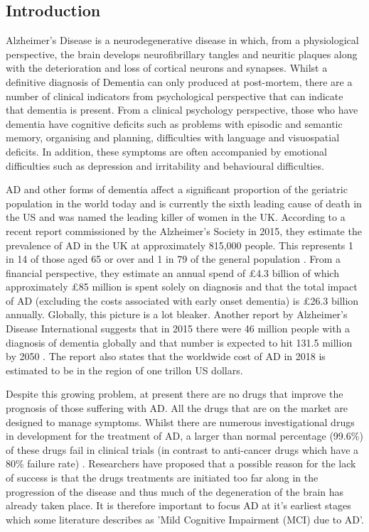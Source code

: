 \documentclass[12pt, twoside, a4paper]{article}
\begin{document}
\subsection{Introduction}
Alzheimer's Disease is a neurodegenerative disease in which, from a physiological perspective, the brain develops neurofibrillary tangles and neuritic plaques along with the deterioration and loss of cortical neurons and synapses. Whilst a definitive diagnosis of Dementia can only produced at post-mortem, there are a number of clinical indicators from psychological perspective that can indicate that dementia is present. From a clinical psychology perspective, those who have dementia have cognitive deficits such as problems with episodic and semantic memory, organising and planning, difficulties with language and visuospatial deficits\cite{AmericanPsychiatricAssociation2013}. In addition, these symptoms are often accompanied by emotional difficulties such as depression and irritability and behavioural difficulties. 
\par
AD and other forms of dementia affect a significant proportion of the geriatric population in the world today and is currently the sixth leading cause of death in the US and was named the leading killer of women in the UK. According to a recent report commissioned by the Alzheimer's Society in 2015, they estimate the prevalence of AD in the UK at approximately 815,000 people. This represents 1 in 14 of those aged 65 or over and 1 in 79 of the general population \cite{Sturrock2016}. From a financial perspective, they estimate an annual spend of £4.3 billion of which approximately £85 million is spent solely on diagnosis and that the total impact of AD (excluding the costs associated with early onset dementia) is £26.3 billion annually. Globally, this picture is a lot bleaker. Another report by Alzheimer's Disease International suggests that in 2015 there were 46 million people with a diagnosis of dementia globally and that number is expected to hit 131.5 million by 2050 \cite{Prince2015}. The report also states that the worldwide cost of AD in 2018 is estimated to be in the region of one trillon US dollars.
\par
Despite this growing problem, at present there are no drugs that improve the prognosis of those suffering with AD. All the drugs that are on the market are designed to manage symptoms. Whilst there are numerous investigational drugs in development for the treatment of AD, a larger than normal percentage (99.6\%) of these drugs fail in clinical trials (in contrast to anti-cancer drugs which have a 80\% failure rate) \cite{Alzheimer2016}. Researchers have proposed that a possible reason for the lack of success is that the drugs treatments are initiated too far along in the progression of the disease and thus much of the degeneration of the brain has already taken place. It is therefore important to focus AD at it's earliest stages which some literature describes as 'Mild Cognitive Impairment (MCI) due to AD'.
\end{document}
